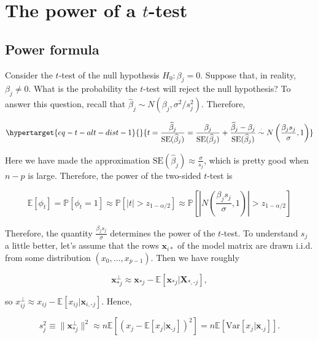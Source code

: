 \documentclass[
  11pt,
  letterpaper,
  oneside]{book}
\theoremstyle{plain}
\theoremstyle{plain}
\theoremstyle{definition}
\theoremstyle{definition}
\theoremstyle{plain}
\theoremstyle{remark}
\begin{document}
\hypertarget{the-power-of-a-t-test}{%
\section{\texorpdfstring{The power of a
\(t\)-test}{The power of a t-test}}\label{the-power-of-a-t-test}}

\hypertarget{power-formula}{%
\subsection{Power formula}\label{power-formula}}

Consider the \(t\)-test of the null hypothesis \(H_0: \beta_j = 0\).
Suppose that, in reality, \(\beta_j \neq 0\). What is the probability
the \(t\)-test will reject the null hypothesis? To answer this question,
recall that \(\widehat \beta_j \sim N(\beta_j, \sigma^2/s_j^2)\).
Therefore,

\begin{equation}\protect\hypertarget{eq-t-alt-dist-1}{}{
t = \frac{\widehat \beta_j}{\text{SE}(\widehat \beta_j)} = \frac{\beta_j}{\text{SE}(\widehat \beta_j)} + \frac{\widehat \beta_j - \beta_j}{\text{SE}(\widehat \beta_j)} \overset{\cdot}{\sim} N\left(\frac{\beta_j s_j}{\sigma}, 1\right)
}\label{eq-t-alt-dist-1}\end{equation}

Here we have made the approximation
\(\text{SE}(\widehat \beta_j) \approx \frac{\sigma}{s_j}\), which is
pretty good when \(n-p\) is large. Therefore, the power of the two-sided
\(t\)-test is

\[
\mathbb{E}[\phi_t] = \mathbb{P}[\phi_t = 1] \approx \mathbb{P}[|t| > z_{1-\alpha/2}] \approx \mathbb{P}\left[\left|N\left(\frac{\beta_j s_j}{\sigma}, 1\right)\right| > z_{1-\alpha/2}\right]
\]

Therefore, the quantity \(\frac{\beta_j s_j}{\sigma}\) determines the
power of the \(t\)-test. To understand \(s_j\) a little better, let's
assume that the rows \(\boldsymbol{x}_{i*}\) of the model matrix are
drawn i.i.d. from some distribution \((x_0, \dots, x_{p-1})\). Then we
have roughly

\[
\boldsymbol{x}_{*j}^\perp \approx \boldsymbol{x}_{*j} - \mathbb{E}[\boldsymbol{x}_{*j}|\boldsymbol{X}_{*, \text{-}j}],
\]

so
\(x_{ij}^\perp \approx x_{ij} - \mathbb{E}[x_{ij}|\boldsymbol{x}_{i,\text{-}j}]\).
Hence,

\[
s_j^2 \equiv \|\boldsymbol{x}_{*j}^\perp\|^2 \approx n\mathbb{E}[(x_j-\mathbb{E}[x_j|\boldsymbol{x}_{\text{-}j}])^2] = n\mathbb{E}[\text{Var}[x_j|\boldsymbol{x}_{\text{-}j}]].
\]
\end{document}

